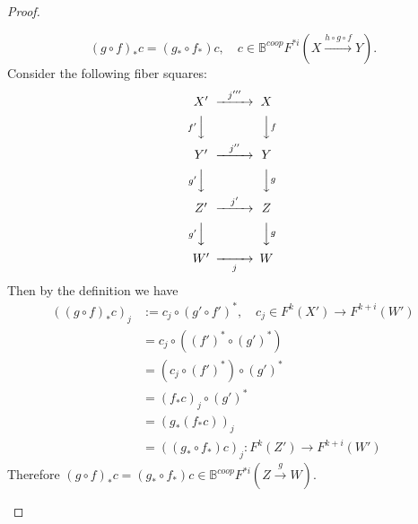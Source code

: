 \documentclass[a4paper]{amsart}
\begin{document}
\begin{proof}
\begin{enumerate}
$$(g\circ f)_* c= (g_* \circ f_*)c, \quad c \in \mathbb B^{coop}F^{* i}(X \xrightarrow {h \circ g \circ f} Y).$$
Consider the following fiber squares:
\begin{equation}\label{cd-2}
\CD
X' @> {j'''} >> X \\
@V {f'}VV @VV {f}V\\
Y' @> {j''} >> Y \\
@V {g'}VV @VV {g}V \\
Z'  @> {j'} >> Z \\
@V {g'}VV @VV {g}V \\
W'  @>> {j} > W 
\endCD 
\end{equation}
Then by the definition we have
\begin{align*}
((g\circ f)_*c)_j & := c_j \circ (g'\circ f')^* , \quad c_j \in F^k(X') \to F^{k+i}(W') \\
                  & = c_j \circ ((f')^* \circ (g')^*) \\
                  & = (c_j \circ (f')^*) \circ (g')^*\\ 
                  & = (f_*c)_j \circ (g')^*\\  
                  & = (g_*(f_*c))_j \\
                  & = ((g_* \circ f_*)c)_j: F^k(Z') \to  F^{k+i}(W')          
\end{align*}
Therefore $(g\circ f)_* c= (g_* \circ f_*)c \in \mathbb B^{coop}F^{* i}(Z \xrightarrow g W).$


\end{enumerate}
\end{proof}
\end{document}
